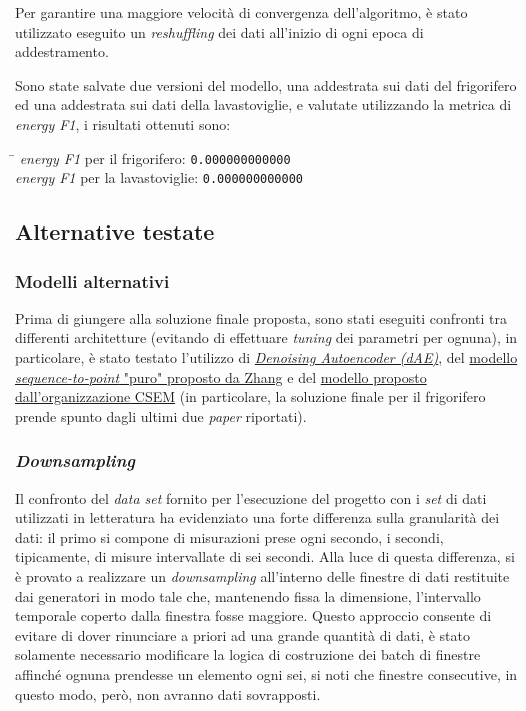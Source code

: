 \documentclass[12pt,a4paper,fleqn]{article}
\begin{document}
Per garantire una maggiore velocità di convergenza dell'algoritmo, è stato utilizzato eseguito un \textsl{reshuffling} dei dati all'inizio di ogni epoca di addestramento.

Sono state salvate due versioni del modello, una addestrata sui dati del frigorifero ed una addestrata sui dati della lavastoviglie, e valutate utilizzando la metrica di \textsl{energy F1}, i risultati ottenuti sono:

\begin{tabbing}
\hspace{2.50in}     \= \hspace{1.00in}		\kill
\textsl{energy F1} per il frigorifero: \> \texttt{0.000000000000}\\
\textsl{energy F1} per la lavastoviglie: \> \texttt{0.000000000000}
\end{tabbing}

\subsection{Alternative testate}

\subsubsection{Modelli alternativi}
Prima di giungere alla soluzione finale proposta, sono stati eseguiti confronti tra differenti architetture (evitando di effettuare \textsl{tuning} dei parametri per ognuna), in particolare, è stato testato l'utilizzo di \href{https://arxiv.org/abs/1507.06594}{\textsl{Denoising Autoencoder (dAE)}}, del \href{https://arxiv.org/abs/1612.09106}{modello \textsl{sequence-to-point} "puro" proposto da Zhang} e del \href{http://nilmworkshop.org/2018/proceedings/Poster_ID20.pdf}{modello proposto dall'organizzazione CSEM} (in particolare, la soluzione finale per il frigorifero prende spunto dagli ultimi due \textsl{paper} riportati).

\subsubsection{\textsl{Downsampling}}
Il confronto del \textsl{data set} fornito per l'esecuzione del progetto con i \textsl{set} di dati utilizzati in letteratura ha evidenziato una forte differenza sulla granularità dei dati: il primo si compone di misurazioni prese ogni secondo, i secondi, tipicamente, di misure intervallate di sei secondi. Alla luce di questa differenza, si è provato a realizzare un \textsl{downsampling} all'interno delle finestre di dati restituite dai generatori in modo tale che, mantenendo fissa la dimensione, l'intervallo temporale coperto dalla finestra fosse maggiore. Questo approccio consente di evitare di dover rinunciare a priori ad una grande quantità di dati, è stato solamente necessario modificare la logica di costruzione dei batch di finestre affinché ognuna prendesse un elemento ogni sei, si noti che finestre consecutive, in questo modo, però, non avranno dati sovrapposti.
\end{document}
